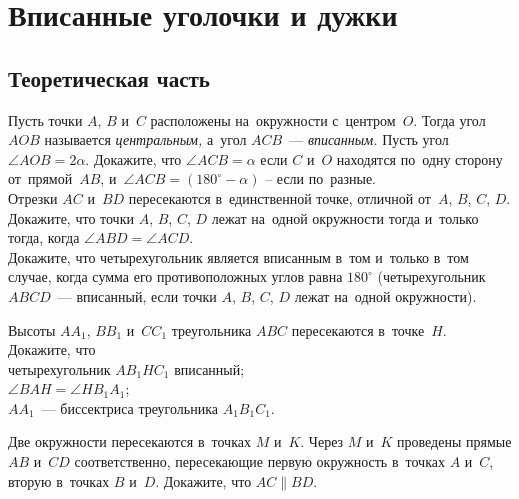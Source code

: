 
\section*{Вписанные уголочки и дужки}


\subsection*{Теоретическая часть}

\begin{problems}
    \makeatletter
        \renewcommand\problem@format[2]{\begingroup\sffamily
            #1.\rlap{\!#2}\endgroup}
        \renewcommand\subproblem@format[2]{\text{\begingroup\sffamily
            #1\rlap{#2}%
            \phantom{#2}%
        .%
        \endgroup}}
    \makeatother
    \small

\subproblem
Пусть точки $A$, $B$ и~$C$ расположены на~окружности с~центром~$O$.
Тогда угол $AOB$ называется \emph{центральным,} а~угол $ACB$~---
\emph{вписанным.}
Пусть угол $\angle AOB = 2 \alpha$.
Докажите, что $\angle ACB = \alpha$ если $C$ и~$O$ находятся по~одну сторону
от~прямой~$AB$, и~$\angle ACB = (180^{\circ} - \alpha)$ -- если по~разные.
\\
\subproblem
Отрезки $AC$ и~$BD$ пересекаются в~единственной точке, отличной
от~$A$, $B$, $C$, $D$.
Докажите, что точки $A$, $B$, $C$, $D$ лежат на~одной окружности тогда и~только
тогда, когда $\angle ABD = \angle ACD$.
\\
\subproblem
Докажите, что четырехугольник является вписанным в~том и~только в~том случае,
когда сумма его противоположных углов равна $180^{\circ}$ (четырехугольник
$ABCD$~--- вписанный, если точки $A$, $B$, $C$, $D$ лежат на~одной окружности).

\item
Высоты $A A_1$, $B B_1$ и~$C C_1$ треугольника $ABC$ пересекаются в~точке~$H$.
Докажите, что
\\
\subproblem четырехугольник $A B_1 H C_1$ вписанный;
\\
\subproblem $\angle BAH = \angle H B_1 A_1$;
\\
\subproblem $A A_1$~--- биссектриса треугольника $A_1 B_1 C_1$.

\item
Две окружности пересекаются в~точках $M$ и~$K$.
Через $M$ и~$K$ проведены прямые $AB$ и~$CD$ соответственно, пересекающие
первую окружность в~точках $A$ и~$C$, вторую в~точках $B$ и~$D$.
Докажите, что $AC \parallel BD$.


\end{problems}
